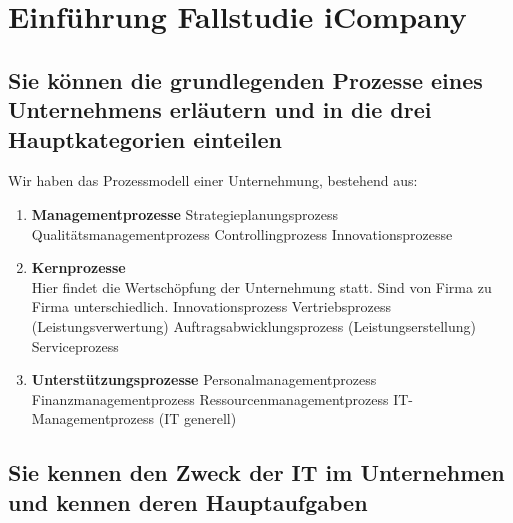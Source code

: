\chapter{Einführung Fallstudie iCompany}

\section{Sie können die grundlegenden Prozesse eines Unternehmens erläutern und in die drei Hauptkategorien einteilen}
Wir haben das Prozessmodell einer Unternehmung, bestehend aus:
\begin{enumerate}
	\item \textbf{Managementprozesse}
		\subitem Strategieplanungsprozess
		\subitem Qualitätsmanagementprozess
		\subitem Controllingprozess
		\subitem Innovationsprozesse
	\item \textbf{Kernprozesse} \\
		Hier findet die Wertschöpfung der Unternehmung statt. Sind von Firma zu Firma unterschiedlich.
		\subitem Innovationsprozess
		\subitem Vertriebsprozess (Leistungsverwertung)
		\subitem Auftragsabwicklungsprozess (Leistungserstellung)
		\subitem Serviceprozess
	\item \textbf{Unterstützungsprozesse}
		\subitem Personalmanagementprozess
		\subitem Finanzmanagementprozess
		\subitem Ressourcenmanagementprozess
		\subitem IT-Managementprozess (IT generell)
\end{enumerate}

\section{Sie kennen den Zweck der IT im Unternehmen und kennen deren Hauptaufgaben}

